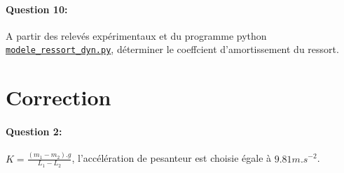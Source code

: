 \paragraph{Question 10:} A partir des relevés expérimentaux et du programme python \href{https://github.com/Costadoat/Sciences-Ingenieur/raw/master/S01\%20Analyse\%20fonctionnelle/TP01\%20Mesures\%20physiques/Ilot_03\%20Ressort/modele_ressort_dyn.py}{\texttt{modele\_ressort\_dyn.py}}, déterminer le coeffcient d'amortissement du ressort.

\clearpage

\ifdef{\public}{}{}

\newpage

\pagestyle{correction}

\section{Correction}

\paragraph{Question 2:} 

$K=\frac{(m_1-m_2).g}{L_1-L_2}$, l'accélération de pesanteur est choisie égale à $9.81m.s^{-2}$.


